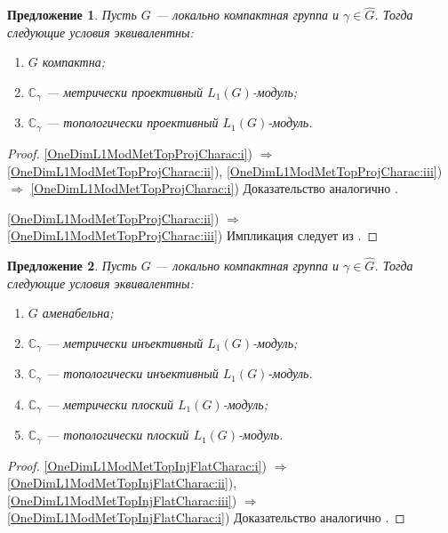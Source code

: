 \documentclass{article}
\numberwithin{equation}{section}
\theoremstyle{plain}
\newtheorem{propos}{Предложение}
\theoremstyle{definition}
\newtheorem{proof}{Доказательство}\def\theproof{}
\begin{document}
\begin{fulltext}
\begin{propos}\label{OneDimL1ModMetTopProjCharac} Пусть $G$ --- локально 
компактная группа и $\gamma\in\widehat{G}$. Тогда следующие условия эквивалентны:
\begin{enumerate}
    \item $G$ компактна;
    \label{OneDimL1ModMetTopProjCharac:i}
    \item $\mathbb{C}_\gamma$ --- метрически проективный $L_1(G)$-модуль;
    \label{OneDimL1ModMetTopProjCharac:ii}
    \item $\mathbb{C}_\gamma$ --- топологически проективный $L_1(G)$-модуль.
    \label{OneDimL1ModMetTopProjCharac:iii}
\end{enumerate}
\end{propos}
\begin{proof} \ref{OneDimL1ModMetTopProjCharac:i}) $\Longrightarrow$ 
\ref{OneDimL1ModMetTopProjCharac:ii}), \ref{OneDimL1ModMetTopProjCharac:iii}) 
$\Longrightarrow$ \ref{OneDimL1ModMetTopProjCharac:i}) Доказательство 
аналогично \cite[теорема~4.2]{GravInjProjBanMod}. 

\ref{OneDimL1ModMetTopProjCharac:ii}) $\Longrightarrow$ 
\ref{OneDimL1ModMetTopProjCharac:iii}) Импликация следует из 
\cite[предложение~2.4]{NemGeomProjInjFlatBanMod}.
\end{proof}

\begin{propos}\label{OneDimL1ModMetTopInjFlatCharac} Пусть $G$ --- локально 
компактная группа и $\gamma\in\widehat{G}$. Тогда следующие условия эквивалентны:
\begin{enumerate}
    \item $G$ аменабельна;
    \label{OneDimL1ModMetTopInjFlatCharac:i}
    \item $\mathbb{C}_\gamma$ --- метрически инъективный $L_1(G)$-модуль;
    \label{OneDimL1ModMetTopInjFlatCharac:ii}
    \item $\mathbb{C}_\gamma$ --- топологически инъективный $L_1(G)$-модуль.
    \label{OneDimL1ModMetTopInjFlatCharac:iii}
    \item $\mathbb{C}_\gamma$ --- метрически плоский $L_1(G)$-модуль;
    \label{OneDimL1ModMetTopInjFlatCharac:iv}
    \item $\mathbb{C}_\gamma$ --- топологически плоский $L_1(G)$-модуль.
    \label{OneDimL1ModMetTopInjFlatCharac:v}
\end{enumerate}
\end{propos}
\begin{proof} \ref{OneDimL1ModMetTopInjFlatCharac:i}) $\Longrightarrow$
\ref{OneDimL1ModMetTopInjFlatCharac:ii}), \ref{OneDimL1ModMetTopInjFlatCharac:iii}) 
$\Longrightarrow$ \ref{OneDimL1ModMetTopInjFlatCharac:i}) Доказательство аналогично 
\cite[теорема~4.5]{GravInjProjBanMod}.


\end{proof}
\end{fulltext}
\end{document}

